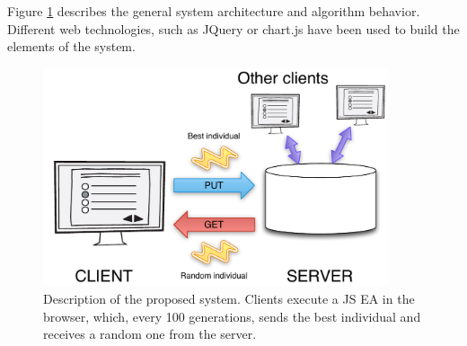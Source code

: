 \documentclass[journal,onecolumn]{IEEEtran}
\begin{document}
Figure \ref{fig:system} describes the general system architecture and
algorithm behavior. Different web technologies, such as JQuery or chart.js have
been used to build the elements of the system. 
\begin{figure}[!t]
\centering
\includegraphics[width=4in]{img/system.pdf}
\caption{Description of the proposed system. Clients execute a JS EA
  in the browser, which, every 100 generations, sends the best
  individual and receives a random one from the server. }  
\label{fig:system}
\end{figure}
\end{document}
